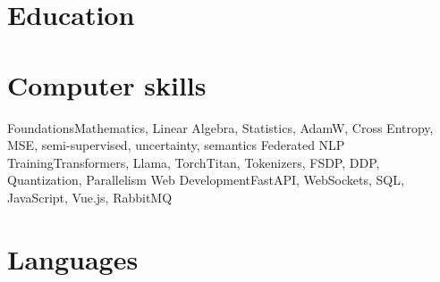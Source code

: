 \documentclass[a4paper, 10pt, final]{moderncv}
\newif\ifextended
\begin{document}
\section{Education}
\ifextended
\cventry{2018--2019}{Pre-Master: Computing Foundations}{Wageningen University, NL}{}{}{
    Mathematics, Linear Algebra, Calculus, Statistics, Probability Theory
}
\cventry{2016--2019}{BSc Secondary School Teacher Biology}{Fontys Hogeschool Tilburg, NL}{}{}{}
\fi

\ifextended
\section{Supervision}
\cventry{2026}{Internship Supervisor}{FSU Jena -- Computer Vision Group}{}{}{
    Hamza Younes (An-Najah National University, Palestine) -- Moth image classification
}
\fi

\section{Computer skills}
  {Foundations}{Mathematics, Linear Algebra, Statistics, AdamW, Cross Entropy, MSE, semi-supervised, uncertainty, semantics}
  {Federated NLP Training}{Transformers, Llama, TorchTitan, Tokenizers, FSDP, DDP, Quantization, Parallelism}
  {Web Development}{FastAPI, WebSockets, SQL, JavaScript, Vue.js, RabbitMQ}
  {}{}

\ifextended
\section{Volunteering}
\cventry{2020--2022}{Member of Youth Board, State Forestry Netherlands}{}{}{}{Advocating for youth involvement in forest policy and decision-making.}
\fi

\section{Languages}
\end{document}
